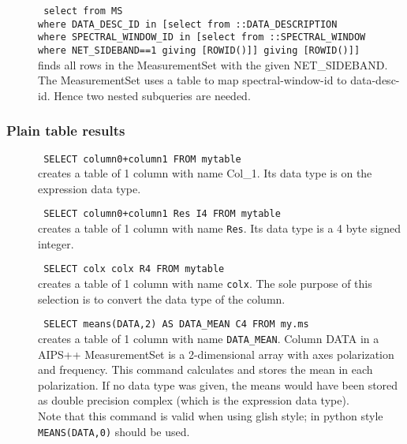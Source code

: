 \begin{description}
  \item[] \texttt{ select from MS}
      \\\texttt{where DATA\_DESC\_ID in [select from ::DATA\_DESCRIPTION}
      \\\texttt{where SPECTRAL\_WINDOW\_ID in [select from ::SPECTRAL\_WINDOW}
      \\\texttt{where NET\_SIDEBAND==1 giving [ROWID()]] giving [ROWID()]]}
      \\finds all rows in the MeasurementSet with the given
      NET\_SIDEBAND.
      \\The MeasurementSet uses a table to map spectral-window-id to
      data-desc-id. Hence two nested subqueries are needed.
\end{description}

\subsubsection{Plain table results}
\begin{description}
  \item[] \texttt{ SELECT column0+column1 FROM mytable }
    \\creates a table of 1 column with name Col\_1. Its data type
      is on the expression data type.

  \item[] \texttt{ SELECT column0+column1 Res I4 FROM mytable }
    \\creates a table of 1 column with name \texttt{Res}.
      Its data type is a 4 byte signed integer.

  \item[] \texttt{ SELECT colx colx R4 FROM mytable }
    \\creates a table of 1 column with name \texttt{colx}.
      The sole purpose of this selection is to convert the data type
      of the column.

  \item[] \texttt{ SELECT means(DATA,2) AS DATA\_MEAN C4 FROM my.ms }
    \\creates a table of 1 column with name \texttt{DATA\_MEAN}.
      Column DATA in a AIPS++ MeasurementSet is a 2-dimensional array
      with axes polarization and frequency. This command calculates
      and stores the mean in each polarization.
      If no data type was given, the means would have been stored
      as double precision complex (which is the expression data type).
      \\Note that this command is valid when using glish style; in
      python style \texttt{MEANS(DATA,0)} should be used.

\end{description}

